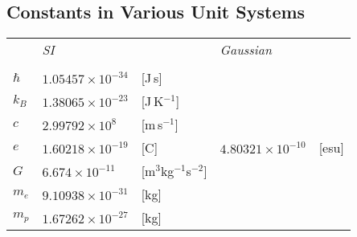 \documentclass[12pt]{book}
\theoremstyle{definition}
\newenvironment{frontstuff}
  {\centering\chapter*{}}
  {\clearpage}
\begin{document}
\begin{frontstuff}
\section*{Constants in Various Unit Systems}
\begin{tabularx}{\linewidth}{LlLll}
 & {\it SI} && {\it Gaussian}&\\ 
\vspace{2mm}\\
$\hbar$  & $1.05457\times 10^{-34}$ & [J\,s]
         & & \\
$k_B$    & $1.38065\times 10^{-23}$ & [J\,K$^{-1}$]
         & & \\
$c$      & $2.99792\times 10^8$ & [m\,s$^{-1}$]
         & & \\
$e$      & $1.60218\times 10^{-19}$ & [C] 
         & $4.80321\times 10^{-10}$ & [esu]\\
$G$      & $6.674\times 10^{-11}$ & [m$^3$kg$^{-1}$s$^{-2}$]
         & & \\
$m_e$    & $9.10938\times 10^{-31}$ & [kg]
         & & \\
$m_p$    & $1.67262\times 10^{-27}$ & [kg]
         & & \\
\end{tabularx}
\clearpage



\end{frontstuff}
\end{document}
